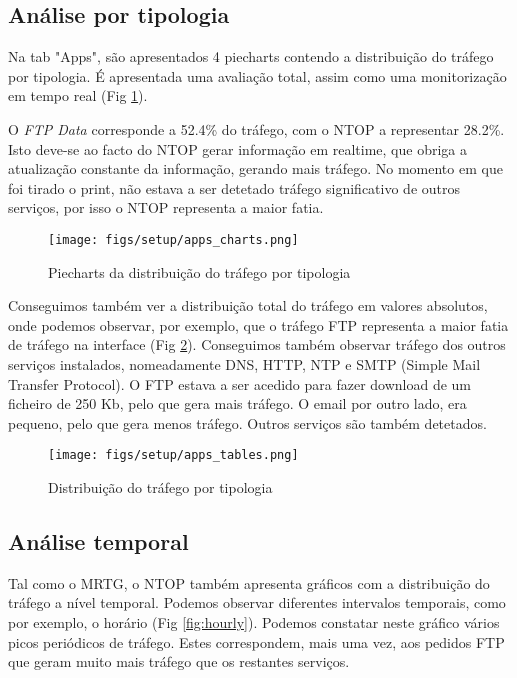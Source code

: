 \subsection{Análise por tipologia}

Na tab "Apps", são apresentados 4 piecharts contendo a distribuição do tráfego por tipologia.
É apresentada uma avaliação total, assim como uma monitorização em tempo real (Fig \ref{fig:apps_charts}).

O \textit{FTP Data} corresponde a 52.4\% do tráfego, com o NTOP a representar 28.2\%.
Isto deve-se ao facto do NTOP gerar informação em realtime, que obriga a atualização constante da informação, gerando mais tráfego.
No momento em que foi tirado o print, não estava a ser detetado tráfego significativo de outros serviços, por isso o NTOP representa a maior fatia.

\begin{figure}
    \centering
    \texttt{[image: figs/setup/apps\_charts.png]}
    \caption{Piecharts da distribuição do tráfego por tipologia}
    \label{fig:apps_charts}
\end{figure}

Conseguimos também ver a distribuição total do tráfego em valores absolutos, onde podemos observar,
por exemplo, que o tráfego FTP representa a maior fatia de tráfego na interface (Fig \ref{fig:apps_table}).
Conseguimos também observar tráfego dos outros serviços instalados, nomeadamente DNS, HTTP, NTP e SMTP (Simple Mail Transfer Protocol).
O FTP estava a ser acedido para fazer download de um ficheiro de 250 Kb, pelo que gera mais tráfego.
O email por outro lado, era pequeno, pelo que gera menos tráfego.
Outros serviços são também detetados.


\begin{figure}
    \centering
    \texttt{[image: figs/setup/apps\_tables.png]}
    \caption{Distribuição do tráfego por tipologia}
    \label{fig:apps_table}
\end{figure}

\subsection{Análise temporal}

Tal como o MRTG, o NTOP também apresenta gráficos com a distribuição do tráfego a nível temporal.
Podemos observar diferentes intervalos temporais, como por exemplo, o horário (Fig \ref{fig:hourly}).
Podemos constatar neste gráfico vários picos periódicos de tráfego.
Estes correspondem, mais uma vez, aos pedidos FTP que geram muito mais tráfego que os restantes serviços.

